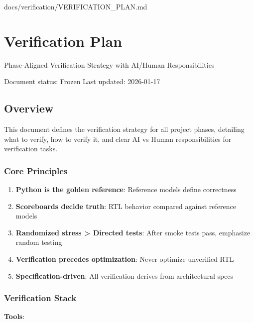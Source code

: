 \begin{relocated}{docs/verification/VERIFICATION_PLAN.md}
\section{Verification Plan}\label{ds:ch:verification-plan}

Phase-Aligned Verification Strategy with AI/Human Responsibilities

Document status: Frozen Last updated: 2026-01-17

\subsection{Overview}\label{ds:ch:verification-plan:overview}

This document defines the verification strategy for all project phases,
detailing what to verify, how to verify it, and clear AI vs Human
responsibilities for verification tasks.

\subsubsection{Core Principles}\label{ds:ch:verification-plan:core-principles}

\begin{enumerate}
\def\labelenumi{\arabic{enumi}.}
\tightlist
\item
  \textbf{Python is the golden reference}: Reference models define
  correctness
\item
  \textbf{Scoreboards decide truth}: RTL behavior compared against
  reference models
\item
  \textbf{Randomized stress \textgreater{} Directed tests}: After smoke
  tests pass, emphasize random testing
\item
  \textbf{Verification precedes optimization}: Never optimize unverified
  RTL
\item
  \textbf{Specification-driven}: All verification derives from
  architectural specs
\end{enumerate}

\subsubsection{Verification Stack}\label{ds:ch:verification-plan:verification-stack}

\textbf{Tools}:


\end{relocated}
